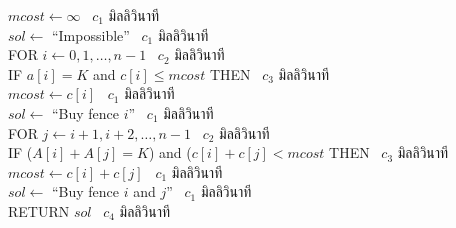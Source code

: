 \begin{algt}
\noindent \hspace*{0.2in} $mcost\leftarrow\infty$ \hfill\ $c_1$ มิ{\wbr}ลลิ{\wbr}วินาที\\
\hspace*{0.2in} $sol\leftarrow$ ``Impossible'' \hfill\ $c_1$ มิ{\wbr}ลลิ{\wbr}วินาที\\
\hspace*{0.2in} FOR $i\leftarrow 0,1,\ldots,n-1$ \hfill\ $c_2$ มิ{\wbr}ลลิ{\wbr}วินาที\\
\hspace*{0.2in}\hspace*{0.2in} IF $a[i]=K$ and $c[i]\leq mcost$ THEN \hfill\ $c_3$ มิ{\wbr}ลลิ{\wbr}วินาที\\
\hspace*{0.2in}\hspace*{0.2in}\hspace*{0.2in} $mcost\leftarrow c[i]$ \hfill\ $c_1$ มิ{\wbr}ลลิ{\wbr}วินาที\\
\hspace*{0.2in}\hspace*{0.2in}\hspace*{0.2in} $sol\leftarrow$ ``Buy fence $i$'' \hfill\ $c_1$ มิ{\wbr}ลลิ{\wbr}วินาที\\
\hspace*{0.2in}\hspace*{0.2in} FOR $j\leftarrow i+1,i+2,\ldots,n-1$ \hfill\ $c_2$ มิ{\wbr}ลลิ{\wbr}วินาที\\
\hspace*{0.2in}\hspace*{0.2in}\hspace*{0.2in} IF ($A[i] + A[j] = K$) and ($c[i]+c[j]<mcost$ THEN \hfill\ $c_3$ มิ{\wbr}ลลิ{\wbr}วินาที\\
\hspace*{0.2in}\hspace*{0.2in}\hspace*{0.2in}\hspace*{0.2in} $mcost\leftarrow c[i]+c[j]$ \hfill\ $c_1$ มิ{\wbr}ลลิ{\wbr}วินาที\\
\hspace*{0.2in}\hspace*{0.2in}\hspace*{0.2in}\hspace*{0.2in} $sol\leftarrow$ ``Buy fence $i$ and $j$'' \hfill\ $c_1$ มิ{\wbr}ลลิ{\wbr}วินาที\\
\hspace*{0.2in} RETURN $sol$ \hfill\ $c_4$ มิ{\wbr}ลลิ{\wbr}วินาที{\wbr}
\end{algt}

